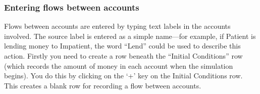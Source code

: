 %
%
%
%

\subsubsection{Entering flows between accounts}


Flows between accounts are entered by typing text labels in the
accounts involved. The source label is entered as a simple name---for
example, if Patient is lending money to Impatient, the word ``Lend''
could be used to describe this action. Firstly you need to create a
row beneath the ``Initial Conditions'' row (which records the amount of
money in each account when the simulation begins). You do this by
clicking on the `+' key on the Initial Conditions row. This creates a
blank row for recording a flow between accounts.


